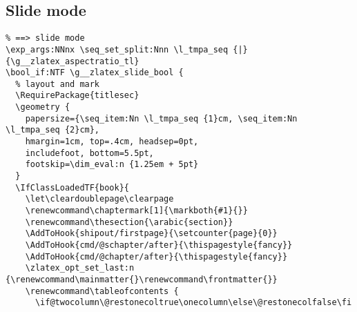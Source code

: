 \subsection{Slide mode}
\begin{verbatim}
% ==> slide mode
\exp_args:NNnx \seq_set_split:Nnn \l_tmpa_seq {|}{\g__zlatex_aspectratio_tl}
\bool_if:NTF \g__zlatex_slide_bool {
  % layout and mark
  \RequirePackage{titlesec}
  \geometry {
    papersize={\seq_item:Nn \l_tmpa_seq {1}cm, \seq_item:Nn \l_tmpa_seq {2}cm},
    hmargin=1cm, top=.4cm, headsep=0pt,
    includefoot, bottom=5.5pt,
    footskip=\dim_eval:n {1.25em + 5pt}
  }
  \IfClassLoadedTF{book}{
    \let\cleardoublepage\clearpage
    \renewcommand\chaptermark[1]{\markboth{#1}{}}
    \renewcommand\thesection{\arabic{section}}
    \AddToHook{shipout/firstpage}{\setcounter{page}{0}}
    \AddToHook{cmd/@schapter/after}{\thispagestyle{fancy}}
    \AddToHook{cmd/@chapter/after}{\thispagestyle{fancy}}
    \zlatex_opt_set_last:n {\renewcommand\mainmatter{}\renewcommand\frontmatter{}}
    \renewcommand\tableofcontents {
      \if@twocolumn\@restonecoltrue\onecolumn\else\@restonecolfalse\fi

\end{verbatim}
